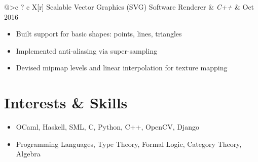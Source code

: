 \documentclass[12pt]{article}
\begin{document}
\begin{tabu}{@{}>{\bfseries}c ? c X[r]}
Scalable Vector Graphics (SVG) Software Renderer & \emph{C++} & Oct 2016
\end{tabu}
\vspace{-5pt}

\begin{itemize}
\itemsep-2pt
\item Built support for basic shapes: points, lines, triangles
\item Implemented anti-aliasing via super-sampling
\item Devised mipmap levels and linear interpolation for texture mapping
\end{itemize}

\section{Interests \& Skills}

\begin{itemize}
\itemsep-2pt
\item OCaml, Haskell, SML, C, Python, C++, OpenCV, Django
\item Programming Languages, Type Theory, Formal Logic, Category Theory, Algebra
\end{itemize}
\end{document}
